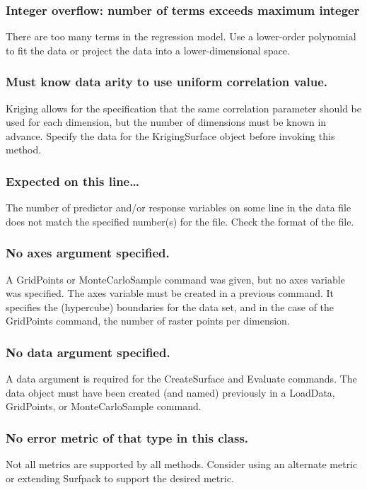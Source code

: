 \documentclass{article}
\begin{document}
\subsubsection{Integer overflow: number of terms exceeds maximum integer}
There are too many terms in the regression model.  Use a lower-order polynomial to fit the data or project the data into a lower-dimensional space.

\subsubsection{Must know data arity to use uniform correlation value.}
Kriging allows for the specification that the same correlation parameter should be used for each dimension, but the number of dimensions must be known in advance.  Specify the data for the KrigingSurface object before invoking this method.

\subsubsection{Expected on this line\ldots}
The number of predictor and/or response variables on some line in the data file does not match the specified number(s) for the file.  Check the format of the file.

\subsubsection{No axes argument specified.}
A GridPoints or MonteCarloSample command was given, but no axes variable was specified.  The axes variable must be created in a previous command.  It specifies the (hypercube) boundaries for the data set, and in the case of the GridPoints command, the number of raster points per dimension.

\subsubsection{No data argument specified.}
A data argument is required for the CreateSurface and Evaluate commands.  The data object must have been created (and named) previously in a LoadData, GridPoints, or MonteCarloSample command.

\subsubsection{No error metric of that type in this class.}
Not all metrics are supported by all methods.  Consider using an alternate metric or extending Surfpack to support the desired metric.
\end{document}
